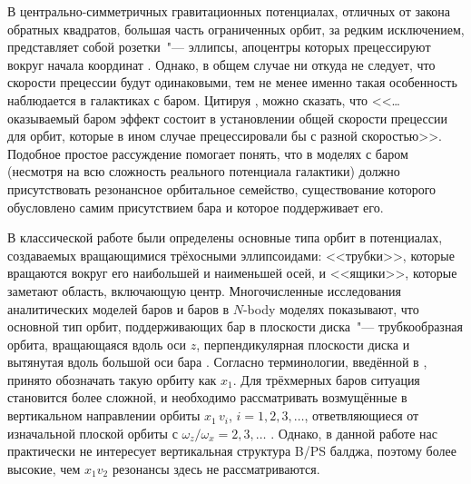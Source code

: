\documentclass[tikz]{trlnotes}
\begin{document}
\newlength{\imageheight}
\imageheight=5.5cm
В центрально-симметричных гравитационных потенциалах, отличных от закона обратных квадратов, большая часть ограниченных орбит, за редким исключением, представляет собой розетки~"--- эллипсы, апоцентры которых прецессируют вокруг начала координат \citep{book:14857}. Однако, в общем случае ни откуда не следует, что скорости прецессии будут одинаковыми, тем не менее именно такая особенность наблюдается в галактиках с баром.
Цитируя \cite{sellwood2014a}, можно сказать, что <<\ldots оказываемый баром эффект состоит в установлении общей скорости
прецессии для орбит, которые в ином случае прецессировали бы с разной скоростью>>.
Подобное простое рассуждение помогает понять, что в моделях с баром (несмотря на всю сложность реального потенциала галактики)
должно присутствовать резонансное орбитальное семейство, существование которого обусловлено самим присутствием бара и которое поддерживает его.

В классической работе \citet{dezeeuw1985} были определены основные типа орбит в потенциалах, создаваемых вращающимися трёхосными эллипсоидами: <<трубки>>, которые вращаются вокруг его наибольшей и наименьшей осей, и <<ящики>>, которые заметают область, включающую центр.  Многочисленные исследования аналитических моделей баров и баров в $N$-body моделях показывают, что основной тип орбит, поддерживающих бар в плоскости диска~"--- трубкообразная орбита, вращающаяся вдоль оси $z$, перпендикулярная плоскости диска и вытянутая вдоль большой оси бара \citep{athanassoula2003}. Согласно терминологии, введённой в \citet{contopoulos1980a}, принято обозначать такую
орбиту как $x_1$. Для трёхмерных баров ситуация становится более сложной, и необходимо рассматривать возмущённые в
вертикальном направлении орбиты $x_1\,v_i$, $i=1,2,3, \dotsc$, ответвляющиеся от изначальной плоской орбиты с
$ω_z/ω_x = 2,3, \dotsc$ \citep{skokos2002a,pfenniger1991}. Однако, в данной работе нас практически не интересует
вертикальная структура B/PS балджа, поэтому более высокие, чем $x_1v_2$ резонансы здесь не рассматриваются.
\end{document}
